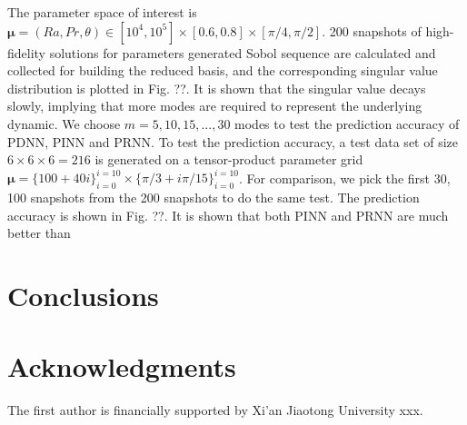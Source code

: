 \documentclass[preprint, 10pt]{elsarticle}
\begin{document}
The parameter space of interest is $\pmb{\mu}=(Ra, Pr, \theta) \in [10^4, 10^5] \times [0.6, 0.8] \times[\pi/4, \pi/2]$. 200 snapshots of high-fidelity solutions for parameters generated Sobol sequence are calculated and collected for building the reduced basis, and the corresponding singular value distribution is plotted in Fig. ??. It is shown that the singular value decays slowly, implying that more modes are required to represent the underlying dynamic. We choose $m=5, 10, 15,...,30$ modes to test the prediction accuracy of PDNN, PINN and PRNN.
To test the prediction accuracy, a test data set of size $6 \times 6 \times 6=216$ is generated on a tensor-product parameter grid $\pmb{\mu}=\{100+ 40i\}_{i=0}^{i=10} \times \{\pi/3+ i\pi/15\}_{i=0}^{i=10}$.
For comparison, we pick the first 30, 100 snapshots from the 200 snapshots to do the same test.
The prediction accuracy is shown in Fig. ??. It is shown that both PINN and PRNN are much better than



\section{Conclusions}





\section*{Acknowledgments}
The first author is financially supported by Xi'an Jiaotong University xxx.



\end{document}

